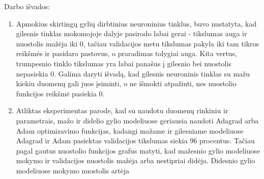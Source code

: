 \documentclass{VUMIFPSkursinis}
\begin{document}
Darbo išvados:
\begin{enumerate}
\item Apmokius skirtingų gylių dirbtinius neuroninius tinklus, buvo nustatyta, kad gilesnis tinklas mokomojoje dalyje pasirodo labai gerai - tikslumas auga ir nuostolis mažėja iki 0, tačiau 
validacijos metu tikslumas pakyla iki tam tikros reikšmės ir pasidaro pastovus, o praradimas tolygiai auga. Kita vertus, trumpesnio tinklo tikslumas yra labai panašus į gilesnio bei nuostolis nepasiekia 0. Galima daryti išvadą, kad gilesnis neuroninis tinklas su mažu kiekiu duomenų gali juos 
įsiminti, o ne išmokti atpažinti, nes nuostolio funkcijos reikšmė pasiekia 0.
\item Atliktas eksperimentas parode, kad su naudotu duomenų rinkiniu ir parametrais, mažo ir didelio gylio modeliuose geriausia naudoti Adagrad arba Adam optimizavimo funkcijas, kadangi mažame ir gilesniame modeliuose Adagrad ir Adam pasiektas 
validacijos tikslumas siekia 96 procentus. Tačiau pagal gautus nuostolio funkcijos grafus matyti, kad mažesnio gylio modeliuose mokymo ir validacijos nuostolis mažėja arba nestipriai didėja. Didesnio gylio modeliuose mokymo nuostolis artėja 

\end{enumerate}
\end{document}
